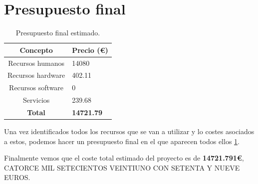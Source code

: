 \section{Presupuesto final}
\renewcommand\arraystretch{1.1}
\begin{table}[!h]
\centering
\begin{adjustbox}{max width=\textwidth}
\begin{tabular}{|c|l|}
\hline
\textbf{Concepto} & \textbf{Precio (\euro)}  \\
\hline \hline
Recursos humanos &  14080 \\
\hline
Recursos hardware & 402.11  \\
\hline
Recursos software & 0 \\
\hline
Servicios & 239.68 \\
\hline
\textbf{Total} & \textbf{14721.79} \\
\hline
\end{tabular}
\end{adjustbox}
\caption{Presupuesto final estimado.}
\label{tab:costes-final}
\end{table}

Una vez identificados todos los recursos que se van a utilizar y lo costes asociados a estos, podemos hacer un presupuesto final en el que aparecen todos ellos \ref{tab:costes-final}.


Finalmente vemos que el coste total estimado del proyecto es de \textbf{14721.791\euro}, CATORCE MIL SETECIENTOS VEINTIUNO CON SETENTA Y NUEVE EUROS.